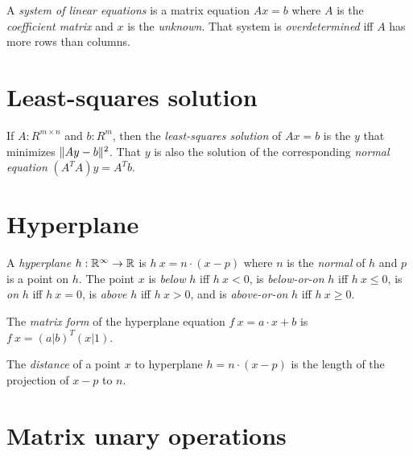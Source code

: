 %
%
%
%
A \emph{system of linear equations} is a matrix equation \(A x = b\)
where \(A\) is the \emph{coefficient matrix} and \(x\) is the \emph{unknown}.
%
%
That system is \emph{overdetermined} iff \(A\) has more rows than columns.

\section{Least-squares solution}

%
%
%
If \(A : R^{m \times n}\) and \(b : R^m\),
then the \emph{least-squares solution} of \(A x = b\)
is the \(y\) that minimizes \(\lVert A y - b\rVert^2\).
%
That \(y\) is also the solution of the corresponding \emph{normal equation}
\((A^T A) y = A^T b\).

\section{Hyperplane}

%
%
%
%
%
%
A \emph{hyperplane}
\(h : \mathbb{R}^\infty \to \mathbb{R}\)
is \(h~x = n \cdot (x - p)\)
where \(n\) is the \emph{normal} of \(h\)
and \(p\) is a point on \(h\).
The point \(x\)
is \emph{below} \(h\) iff \( h~x < 0 \),
is \emph{below-or-on} \(h\) iff \( h~x \le 0 \),
is \emph{on} \(h\) iff \( h~x = 0 \),
is \emph{above} \(h\) iff \( h~x > 0 \),
and
is \emph{above-or-on} \(h\) iff \( h~x \ge 0 \).

%
%
The \emph{matrix form} of the hyperplane equation \(f~x = a \cdot x + b\)
is \(f~x = (a|b)^T (x|1)\).

The \emph{distance} of a point \(x\) to hyperplane \(h = n \cdot (x - p)\)
is the length of the projection of \(x-p\) to \(n\).

\section{Matrix unary operations}

